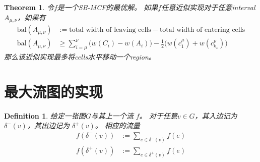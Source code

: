 \documentclass[UTF8,a4paper]{ctexart}
\newcommand{\bal}{\text{bal}}
\newtheorem{theorem}{Theorem}
\newtheorem{definition}{Definition}
\begin{document}
\begin{theorem}
    令$f$是一个SB-MCF的最优解。
    如果$f$任意近似实现对于任意interval $A_{\mu,\nu}$，如果有
    \begin{align*}
        \bal(A_{\mu,\nu}) &:=\text{total width of leaving cells} - \text{total width of entering cells}\\
        \bal(A_{\mu,\nu}) &\geq \sum_{i=\mu}^{\nu}\bigl(%
            w(C_i)-w(A_i)%
        \bigr)%
        -\frac{1}{2}\bigl(%
            w(c^{\mu}_1)+w(c^{\nu}_{k_\nu})
        \bigr)%
    \end{align*}
    那么该近似实现最多将cells水平移动一个region。
\end{theorem}

\section{最大流图的实现}

\begin{definition}
    给定一张图$G$与其上一个流 $f$。
    对于任意$v\in G$，其入边记为 $\delta^-(v)$，其出边记为 $\delta^+(v)$。
    相应的流量 
    \begin{align*}
        f(\delta^-(v)) &:=\sum_{e\in\delta^-(v)}f(e)\\
        f(\delta^+(v)) &:=\sum_{e\in\delta^+(v)}f(e)
    \end{align*}
\end{definition}
\end{document}
